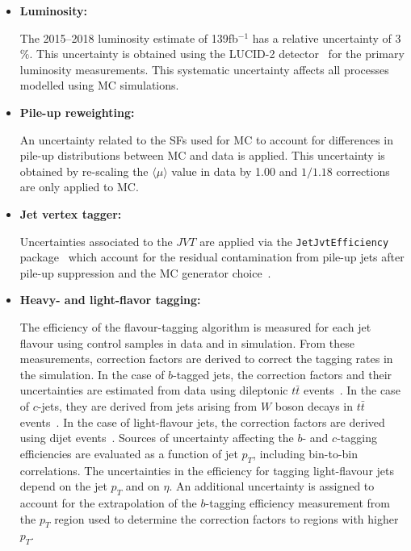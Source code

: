 \begin{itemize}
\item \textbf{Luminosity:}

The 2015--2018 luminosity estimate of 139fb$^{-1}$ has a relative uncertainty of 3$\%$. This uncertainty is obtained using
the LUCID-2 detector~\cite{Avoni:2018} for the primary luminosity measurements. This systematic uncertainty affects all processes modelled using MC simulations.


\item \textbf{Pile-up reweighting:}

An uncertainty related to the SFs used for MC to account for differences in pile-up distributions between MC and data is applied.
This uncertainty is obtained by re-scaling the $\langle \mu \rangle$ value in data by \num{1.00} and $1/1.18$ corrections are only applied to MC.


\item \textbf{Jet vertex tagger:}

Uncertainties associated to the $JVT$ are applied via the \texttt{JetJvtEfficiency} package~\cite{twiki-JVT} which account for the
residual contamination from pile-up jets after pile-up suppression and the MC generator choice~\cite{PERF-2016-06}.


\item \textbf{Heavy- and light-flavor tagging:}

The efficiency of the flavour-tagging algorithm is measured for each jet flavour using control samples in data and in simulation. From these
measurements, correction factors are derived to correct the tagging rates in the simulation. In the case of $b$-tagged jets, the correction factors and
their uncertainties are estimated from data using dileptonic $t\bar{t}$ events~\cite{PERF-2016-05,FTAG-2018-01}. In the case of $c$-jets, they are derived from
jets arising from $W$ boson decays in $t\bar{t}$ events~\cite{ATLAS-CONF-2018-001}. In the case of light-flavour jets, the correction factors are derived
using dijet events~\cite{ATLAS-CONF-2018-006}. Sources of uncertainty affecting the $b$- and $c$-tagging efficiencies are evaluated as a function of
jet $p_{T}$, including bin-to-bin correlations. The uncertainties in the efficiency for tagging light-flavour jets depend on the jet $p_{T}$ and on $\eta$.
An additional uncertainty is assigned to account for the extrapolation of the $b$-tagging efficiency measurement from the $p_{T}$ region used
to determine the correction factors to regions with higher $p_{T}$.



\end{itemize}
